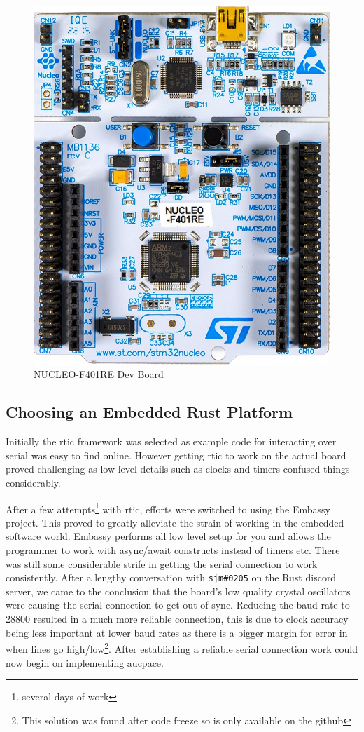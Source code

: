 \begin{figure}[H]
  \centering

  \includegraphics[angle=90,width=0.8\linewidth]{assets/stm32-f410re.jpg}
  \caption{NUCLEO-F401RE Dev Board}
  \label{fig:nucleo-f401re}
\end{figure}

\subsection{Choosing an Embedded Rust Platform}
Initially the \gls{rtic} framework was selected as example code for interacting over serial was easy to find online.
However getting \gls{rtic} to work on the actual board proved challenging as low level details such as clocks and timers confused things considerably.

After a few attempts\footnote{several days of work} with \gls{rtic}, efforts were switched to using the Embassy project.
This proved to greatly alleviate the strain of working in the embedded software world.
Embassy performs all low level setup for you and allows the programmer to work with async/await constructs instead of timers etc.
There was still some considerable strife in getting the serial connection to work consistently.
After a lengthy conversation with \texttt{sjm\#0205} on the Rust discord server, we came to the conclusion that the board's low quality crystal oscillators were causing the serial connection to get out of sync.
Reducing the baud rate to 28800 resulted in a much more reliable connection, this is due to clock accuracy being less important at lower baud rates as there is a bigger margin for error in when lines go high/low\footnote{This solution was found after code freeze so is only available on the github}.
After establishing a reliable serial connection work could now begin on implementing \gls{aucpace}.

